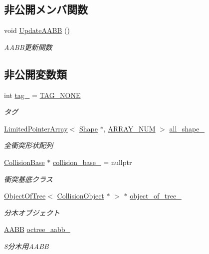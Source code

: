 \subsection*{非公開メンバ関数}
\begin{DoxyCompactItemize}
\item 
void \mbox{\hyperlink{class_collision_object_af2d31d33d299ca9701b93b4dc0294809}{Update\+A\+A\+BB}} ()
\begin{DoxyCompactList}\small\item\em A\+A\+B\+B更新関数 \end{DoxyCompactList}\end{DoxyCompactItemize}
\subsection*{非公開変数類}
\begin{DoxyCompactItemize}
\item 
int \mbox{\hyperlink{class_collision_object_a104bfc5534ba8ea189a45de9ba32f6ee}{tag\+\_\+}} = \mbox{\hyperlink{class_collision_object_a22badef1e6fc9c2b1f002bd99ede049f}{T\+A\+G\+\_\+\+N\+O\+NE}}
\begin{DoxyCompactList}\small\item\em タグ \end{DoxyCompactList}\item 
\mbox{\hyperlink{class_limited_pointer_array}{Limited\+Pointer\+Array}}$<$ \mbox{\hyperlink{class_collision_object_1_1_shape}{Shape}} $\ast$, \mbox{\hyperlink{class_collision_object_a71cbd23c3332b3833d35efd69928804d}{A\+R\+R\+A\+Y\+\_\+\+N\+UM}} $>$ \mbox{\hyperlink{class_collision_object_a2a785df2af0a784ef88e527cc41a7328}{all\+\_\+shape\+\_\+}}
\begin{DoxyCompactList}\small\item\em 全衝突形状配列 \end{DoxyCompactList}\item 
\mbox{\hyperlink{class_collision_base}{Collision\+Base}} $\ast$ \mbox{\hyperlink{class_collision_object_a1d78432ab67e6554356ac9882f421501}{collision\+\_\+base\+\_\+}} = nullptr
\begin{DoxyCompactList}\small\item\em 衝突基底クラス \end{DoxyCompactList}\item 
\mbox{\hyperlink{class_object_of_tree}{Object\+Of\+Tree}}$<$ \mbox{\hyperlink{class_collision_object}{Collision\+Object}} $\ast$ $>$ $\ast$ \mbox{\hyperlink{class_collision_object_a99020569ae9dd130b0f92751c5bff0f9}{object\+\_\+of\+\_\+tree\+\_\+}}
\begin{DoxyCompactList}\small\item\em 分木オブジェクト \end{DoxyCompactList}\item 
\mbox{\hyperlink{class_a_a_b_b}{A\+A\+BB}} \mbox{\hyperlink{class_collision_object_a045baf059f7c85af820677c26b47d03d}{octree\+\_\+aabb\+\_\+}}
\begin{DoxyCompactList}\small\item\em 8分木用\+A\+A\+BB \end{DoxyCompactList}\end{DoxyCompactItemize}
